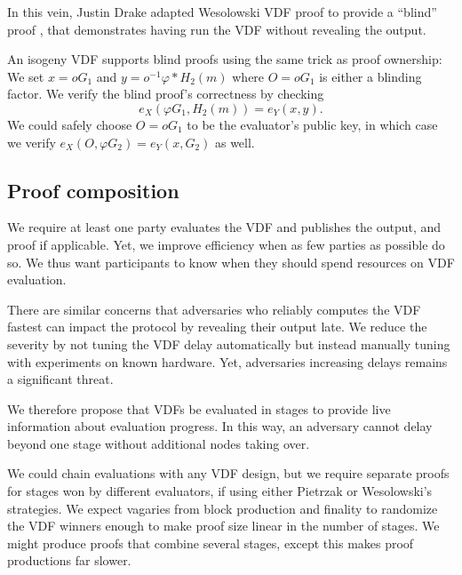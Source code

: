 \documentclass{article}
\newcommand\mathperiod{.}
\begin{document}
In this vein, Justin Drake adapted Wesolowski VDF proof to provide
a ``blind'' proof \cite{}, %
that demonstrates having run the VDF without revealing the output.

An isogeny VDF supports blind proofs using the same trick as proof
ownership:  We set $x = o G_1$ and $y = o^{-1} φ* H_2(m)$
where $O = o G_1$ is either a blinding factor.
We verify the blind proof's correctness by checking
$$ e_X( φ G_1, H_2(m) ) = e_Y( x, y ) \mathperiod $$ %
We could safely choose $O = o G_1$ to be the evaluator's public key,
in which case we verify $e_X(O, φ G_2) = e_Y(x, G_2)$ as well.


\subsection{Proof composition}

We require at least one party evaluates the VDF and publishes the output, and proof if applicable.  Yet, we improve efficiency when as few parties as possible do so.  We thus want participants to know when they should spend resources on VDF evaluation.

There are similar concerns that adversaries who reliably computes the VDF fastest can impact the protocol by revealing their output late.  We reduce the severity by not tuning the VDF delay automatically but instead manually tuning with experiments on known hardware.  Yet, adversaries increasing delays remains a significant threat.

We therefore propose that VDFs be evaluated in stages to provide live information about evaluation progress.  In this way, an adversary cannot delay beyond one stage without additional nodes taking over.  

We could chain evaluations with any VDF design, but we require separate proofs for stages won by different evaluators, if using either Pietrzak or Wesolowski's strategies.  We expect vagaries from block production and finality to randomize the VDF winners enough to make proof size linear in the number of stages.  We might produce proofs that combine several stages, except this makes proof productions far slower.
\end{document}
